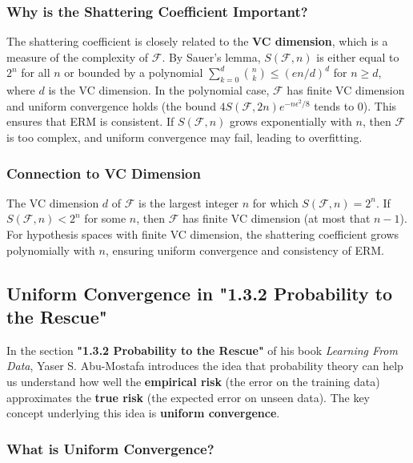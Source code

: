 \begin{notechapter}
\subsubsection{Why is the Shattering Coefficient Important?}
The shattering coefficient is closely related to the \textbf{VC dimension}, which is a measure of the complexity of \( \mathcal{F} \). By Sauer's lemma, \( S(\mathcal{F}, n) \) is either equal to \( 2^n \) for all \( n \) or bounded by a polynomial \( \sum_{k=0}^{d}\binom{n}{k} \leq (en/d)^d \) for \( n \geq d \), where \( d \) is the VC dimension. In the polynomial case, \( \mathcal{F} \) has finite VC dimension and uniform convergence holds (the bound \( 4S(\mathcal{F},2n)e^{-n\epsilon^2/8} \) tends to \( 0 \)). This ensures that ERM is consistent. If \( S(\mathcal{F}, n) \) grows exponentially with \( n \), then \( \mathcal{F} \) is too complex, and uniform convergence may fail, leading to overfitting.

\subsubsection{Connection to VC Dimension}
The VC dimension \( d \) of \( \mathcal{F} \) is the largest integer \( n \) for which \( S(\mathcal{F}, n) = 2^n \). If \( S(\mathcal{F}, n) < 2^n \) for some \( n \), then \( \mathcal{F} \) has finite VC dimension (at most that \( n - 1 \)). For hypothesis spaces with finite VC dimension, the shattering coefficient grows polynomially with \( n \), ensuring uniform convergence and consistency of ERM.

\subsection{Uniform Convergence in "1.3.2 Probability to the Rescue"}

In the section \textbf{"1.3.2 Probability to the Rescue"} of his book \textit{Learning From Data}, Yaser S. Abu-Mostafa introduces the idea that probability theory can help us understand how well the \textbf{empirical risk} (the error on the training data) approximates the \textbf{true risk} (the expected error on unseen data). The key concept underlying this idea is \textbf{uniform convergence}.

\subsubsection{What is Uniform Convergence?}


\end{notechapter}
